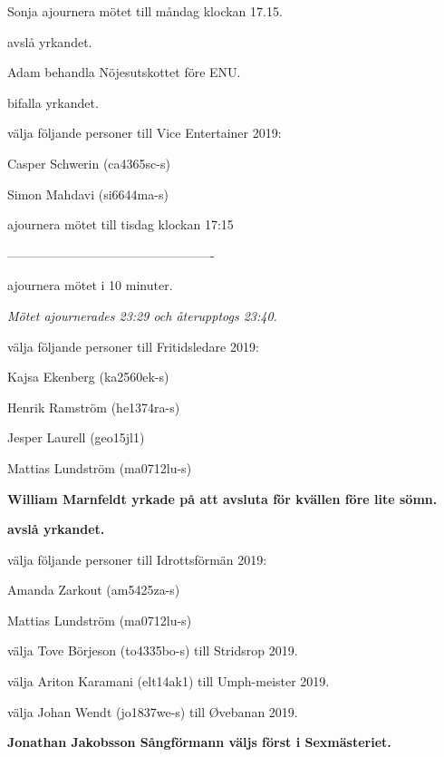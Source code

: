 \documentclass[10pt]{article}
\begin{document}
\begin{paragrafer}
\begin{paralist}
    Sonja \ypa ajournera mötet till måndag klockan 17.15.

    \Mba avslå yrkandet.

    Adam \ypa behandla Nöjesutskottet före ENU.

    \Mba bifalla yrkandet.

    \Mba välja följande personer till Vice Entertainer 2019:
    \begin{tightdashlist}
        \item Casper Schwerin (ca4365sc-s)
        \item Simon Mahdavi (si6644ma-s)
    \end{tightdashlist}


\Mba ajournera mötet till tisdag klockan 17:15

-------------------------------------------------

    \Mba ajournera mötet i 10 minuter.

    \emph{Mötet ajournerades 23:29 och återupptogs 23:40.}

    \Mba välja följande personer till Fritidsledare 2019:
    \begin{tightdashlist}
        \item Kajsa Ekenberg (ka2560ek-s)
        \item Henrik Ramström (he1374ra-s)
        \item Jesper Laurell  (geo15jl1)
        \item Mattias Lundström (ma0712lu-s)
    \end{tightdashlist}

    \textbf{William Marnfeldt yrkade på att avsluta för kvällen före lite sömn.}

    \textbf{\Mba avslå yrkandet.}

    \Mba välja följande personer till Idrottsförmän 2019:
    \begin{tightdashlist}
        \item Amanda Zarkout (am5425za-s)
        \item Mattias Lundström (ma0712lu-s)
    \end{tightdashlist}

    \Mba välja Tove Börjeson (to4335bo-s) till Stridsrop 2019.

    \Mba välja Ariton Karamani (elt14ak1) till Umph-meister 2019.

    \Mba välja Johan Wendt (jo1837we-s) till Øvebanan 2019.

    \textbf{Jonathan Jakobsson \ypa Sångförmann väljs först i Sexmästeriet.}


\end{paralist}
\end{paragrafer}
\end{document}
